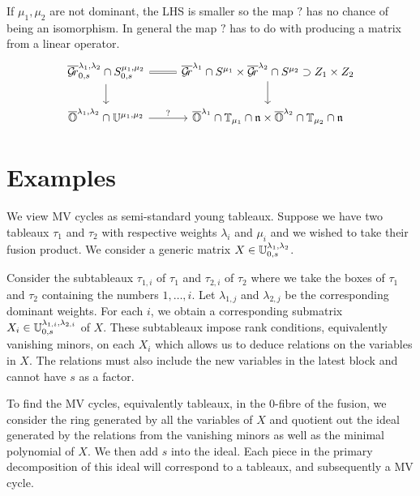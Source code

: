 \documentclass[draft]{article}
\begin{document}
\begin{question}
    If $\mu_1,\mu_2$ are not dominant, the LHS is smaller so the map $?$ has no chance of being an isomorphism. In general the map $?$ has to do with producing a matrix from a linear operator. 
    \[
    \begin{tikzcd}
        \overline\Gr^{\lambda_1,\lambda_2}_{0,s}\cap S^{\mu_1,\mu_2}_{0,s} \ar[r,equals]\ar[d] & \overline\Gr^{\lambda_1} \cap S^{\mu_1} \times \overline\Gr^{\lambda_2} \cap S^{\mu_2} \supset Z_1 \times Z_2 \ar[d]\\
        \overline\OO^{\lambda_1,\lambda_2} \cap \UU^{\mu_1,\mu_2} \ar[r,"?"] & \overline\OO^{\lambda_1}\cap \TT_{\mu_1}\cap \n \times \overline\OO^{\lambda_2}\cap \TT_{\mu_2}\cap \n
    \end{tikzcd}    
    \]
\end{question}

\section{Examples}


We view MV cycles as semi-standard young tableaux. Suppose we have two tableaux $\tau_1$ and $\tau_2$ with respective weights $\lambda_i$ and $\mu_i$ and we wished to take their fusion product. We consider a generic matrix $X \in \mathbb U^{\lambda_1,\lambda_2}_{0,s}$. 

Consider the subtableaux $\tau_{1,i}$ of $\tau_1$ and $\tau_{2,i}$ of $\tau_2$ where we take the boxes of $\tau_1$ and $\tau_2$ containing the numbers $1,\dots,i$. Let $\lambda_{1,j}$ and $\lambda_{2,j}$ be the corresponding dominant weights. For each $i$, we obtain a corresponding submatrix $X_i \in \mathbb U^{\lambda_{1,i}, \lambda_{2,i}}_{0,s}$ of $X$. These subtableaux impose rank conditions, equivalently vanishing minors, on each $X_i$ which allows us to deduce relations on the variables in $X$. The relations must also include the new variables in the latest block and cannot have $s$ as a factor.

To find the MV cycles, equivalently tableaux, in the $0$-fibre of the fusion, we consider the ring generated by all the variables of $X$ and quotient out the ideal generated by the relations from the vanishing minors as well as the minimal polynomial of $X$. We then add $s$ into the ideal. Each piece in the primary decomposition of this ideal will correspond to a tableaux, and subsequently a MV cycle.
\end{document}
